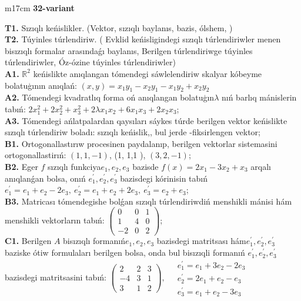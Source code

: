 \documentclass{article}
\begin{document}
\begin{tabular}{m{17cm}}
\textbf{32-variant}
\newline

\textbf{T1.} Sızıqlı keńislikler.   (Vektor,  sızıqlı baylanıs, bazis, ólshem, )  \\
\textbf{T2.} Túyinles túrlendiriw. ( Evklid keńisligindegi sızıqlı túrlendiriwler menen bisızıqlı formalar arasındaǵı baylanıs, Berilgen túrlendiriwge túyinles túrlendiriwler, Óz-ózine túyinles túrlendiriwler) \\
\textbf{A1.} \(\mathbb{R}^{2}\) keńislikte anıqlangan tómendegi sáwlelendiriw skalyar kóbeyme bolatuģının anıqlań: \((x,y) = x_{1}y_{1} - x_{2}y_{1} - x_{1}y_{2} + x_{2}y_{2}\) \\
\textbf{A2.} Tómendegi kvadratlıq forma oń anıqlangan bolatuģın\(\lambda\) nıń barlıq mánislerin tabıń: \(2x_{1}^{2} + 2x_{2}^{2} + x_{3}^{2} + 2\lambda x_{1}x_{2} + 6x_{1}x_{3} + 2x_{2}x_{3}\); \\
\textbf{A3.} Tómendegi ańlatpalardan qaysıları sáykes túrde berilgen vektor keńislikte sızıqlı túrlendiriw boladı: sızıqlı keńislik,, bul jerde -fiksirlengen vektor; \\
\textbf{B1.} Ortogonallastırıw procesinen paydalanıp, berilgen vektorlar sistemasini ortogonallastirıń: \((1,1, - 1)\), (1, 1,1 ), \((3,2, - 1)\); \\
\textbf{B2.} Eger \(f\) sızıqlı funkciya\(e_{1},e_{2},e_{3}\) bazisde \(f(x) = 2x_{1} - 3x_{2} + x_{3}\) arqalı anıqlanǵan bolsa, onıń \(e_{1}^{'},e_{2}^{'},e_{3}^{'}\) bazisdegi kórinisin tabıń\(e_{1}^{'} = e_{1} + e_{2} - 2e_{3},\ e_{2}^{'} = e_{1} + e_{2} + 2e_{3},\ e_{3}^{'} = e_{2} + e_{3}\); \\
\textbf{B3.} Matricası tómendegishe bolǵan sızıqlı túrlendiriwdiń menshikli mánisi hám menshikli vektorların tabıń: \(\begin{pmatrix} 0 & 0 & 1 \\ 1 & 4 & 0 \\  - 2 & 0 & 2 \end{pmatrix}\); \\
\textbf{C1.} Berilgen \(A\) bisızıqlı formanıń\(e_{1},e_{2},e_{3}\) bazisdegi matritsası hám\(e_{1}^{'},e_{2}^{'},e_{3}^{'}\) baziske ótiw formulaları berilgen bolsa, onda bul bisızıqli formanıń \(e_{1}^{'},e_{2}^{'},e_{3}^{'}\) bazisdegi matritsasini tabıń: \(\begin{pmatrix} 2 & 2 & 3 \\  - 4 & 3 & 1 \\ 3 & 1 & 2 \end{pmatrix},\ \begin{matrix}  & e_{1}^{'} = e_{1} + 3e_{2} - 2e_{3} \\  & e_{2}^{'} = 2e_{1} + e_{2} - e_{3} \\  & e_{3}^{'} = e_{1} + e_{2} - 3e_{3} \end{matrix}\) \\

\end{tabular}
\end{document}
